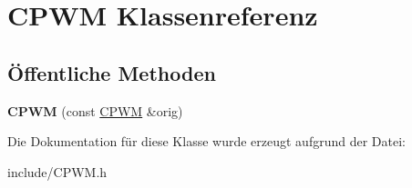 \hypertarget{class_c_p_w_m}{\section{\-C\-P\-W\-M \-Klassenreferenz}
\label{class_c_p_w_m}
}
\subsection*{Öffentliche \-Methoden}
\begin{DoxyCompactItemize}
\item 
\hypertarget{class_c_p_w_m_aacaf1dfa5e9674249dfe0a2ed5753e4d}{{\bfseries \-C\-P\-W\-M} (const \hyperlink{class_c_p_w_m}{\-C\-P\-W\-M} \&orig)}\label{class_c_p_w_m_aacaf1dfa5e9674249dfe0a2ed5753e4d}

\end{DoxyCompactItemize}


\-Die \-Dokumentation für diese \-Klasse wurde erzeugt aufgrund der \-Datei\-:\begin{DoxyCompactItemize}
\item 
include/\-C\-P\-W\-M.\-h\end{DoxyCompactItemize}
